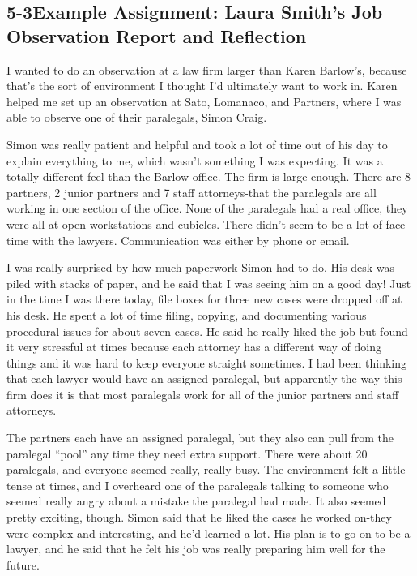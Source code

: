 \pagebreak \subsection*{5-3\quad Example Assignment: Laura Smith's Job Observation Report and Reflection}
I wanted to do an observation at a law firm larger than Karen Barlow's, because that's the sort of environment I thought I'd ultimately want to work in. Karen helped me set up an observation at Sato, Lomanaco, and Partners, where I was able to observe one of their paralegals, Simon Craig.

Simon was really patient and helpful and took a lot of time out of his day to explain everything to me, which wasn't something I was expecting. It was a totally different feel than the Barlow office. The firm is large enough. There are 8 partners, 2 junior partners and 7 staff attorneys-that the paralegals are all working in one section of the office. None of the paralegals had a real office, they were all at open workstations and cubicles. There didn't seem to be a lot of face time with the lawyers. Communication was either by phone or email.

I was really surprised by how much paperwork Simon had to do. His desk was piled with stacks of paper, and he said that I was seeing him on a good day! Just in the time I was there today, file boxes for three new cases were dropped off at his desk. He spent a lot of time filing, copying, and documenting various procedural issues for about seven cases. He said he really liked the job but found it very stressful at times because each attorney has a different way of doing things and it was hard to keep everyone straight sometimes. I had been thinking that each lawyer would have an assigned paralegal, but apparently the way this firm does it is that most paralegals work for all of the junior partners and staff attorneys.

The partners each have an assigned paralegal, but they also can pull from the paralegal ``pool'' any time they need extra support. There were about 20 paralegals, and everyone seemed really, really busy. The environment felt a little tense at times, and I overheard one of the paralegals talking to someone who seemed really angry about a mistake the paralegal had made. It also seemed pretty exciting, though. Simon said that he liked the cases he worked on-they were complex and interesting, and he'd learned a lot. His plan is to go on to be a lawyer, and he said that he felt his job was really preparing him well for the future.

